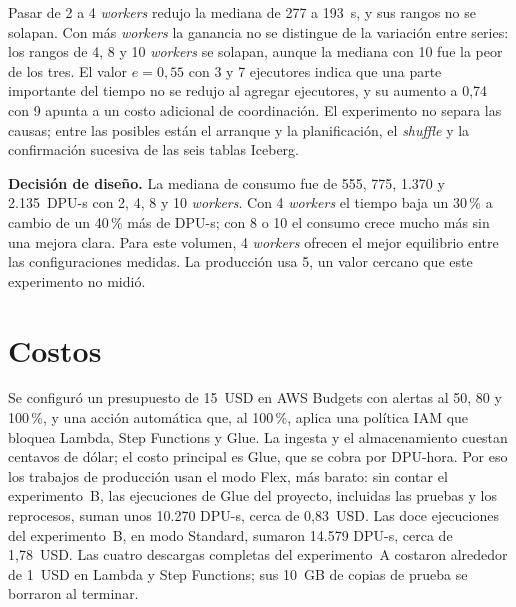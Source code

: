 \documentclass[conference]{IEEEtran}
\begin{document}
Pasar de 2 a 4 \textit{workers} redujo la mediana de 277 a 193~s, y sus rangos no se solapan. Con más \textit{workers} la ganancia no se distingue de la variación entre series: los rangos de 4, 8 y 10 \textit{workers} se solapan, aunque la mediana con 10 fue la peor de los tres. El valor $e = 0{,}55$ con 3 y 7 ejecutores indica que una parte importante del tiempo no se redujo al agregar ejecutores, y su aumento a 0,74 con 9 apunta a un costo adicional de coordinación. El experimento no separa las causas; entre las posibles están el arranque y la planificación, el \textit{shuffle} y la confirmación sucesiva de las seis tablas Iceberg.

\textbf{Decisión de diseño.} La mediana de consumo fue de 555, 775, 1.370 y 2.135~DPU-s con 2, 4, 8 y 10 \textit{workers}. Con 4 \textit{workers} el tiempo baja un 30\,\% a cambio de un 40\,\% más de DPU-s; con 8 o 10 el consumo crece mucho más sin una mejora clara. Para este volumen, 4 \textit{workers} ofrecen el mejor equilibrio entre las configuraciones medidas. La producción usa 5, un valor cercano que este experimento no midió.

\section{Costos}
Se configuró un presupuesto de 15~USD en AWS Budgets con alertas al 50, 80 y 100\,\%, y una acción automática que, al 100\,\%, aplica una política IAM que bloquea Lambda, Step Functions y Glue. La ingesta y el almacenamiento cuestan centavos de dólar; el costo principal es Glue, que se cobra por DPU-hora. Por eso los trabajos de producción usan el modo Flex, más barato: sin contar el experimento~B, las ejecuciones de Glue del proyecto, incluidas las pruebas y los reprocesos, suman unos 10.270 DPU-s, cerca de 0,83~USD. Las doce ejecuciones del experimento~B, en modo Standard, sumaron 14.579 DPU-s, cerca de 1,78~USD. Las cuatro descargas completas del experimento~A costaron alrededor de 1~USD en Lambda y Step Functions; sus 10~GB de copias de prueba se borraron al terminar.

\end{document}
